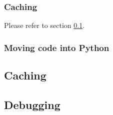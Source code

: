 \subsubsection{Caching}
\label{puttingItTogether.optimization.caching}

Please refer to section \ref{puttingItTogether.caching}.

\subsubsection{Moving code into Python}
\label{puttingItTogether.optimization.intoPython}


\subsection{Caching}
\label{puttingItTogether.caching}


\subsection{Debugging}
\label{puttingItTogether.debugging}




